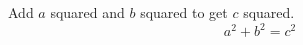 \documentclass[12pt, a4paper]{article}
\begin{document}
	Add $a$ squared and $b$ squared  to get $c$ squared. 
	\[a^{2}+b^{2}=c^{2}  \]
\end{document}
